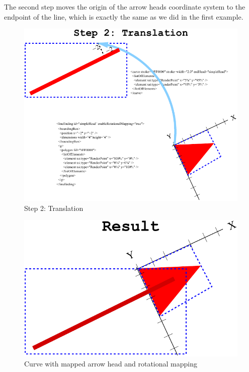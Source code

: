 The second step moves the origin of the arrow heads coordinate system to the endpoint of the line, which is exactly the same as we did in the first example.

\begin{figure}[!ht]
\begin{center}
\includegraphics{figures/ArrowHeadMapping4.pdf}
\end{center}
\caption{Step 2: Translation}
\label{ArrowHeadMapping4}
\end{figure}

\begin{figure}[!ht]
\begin{center}
\includegraphics{figures/ArrowHeadMapping5.pdf}
\end{center}
\caption{Curve with mapped arrow head and rotational mapping}
\label{ArrowHeadMapping5}
\end{figure}

